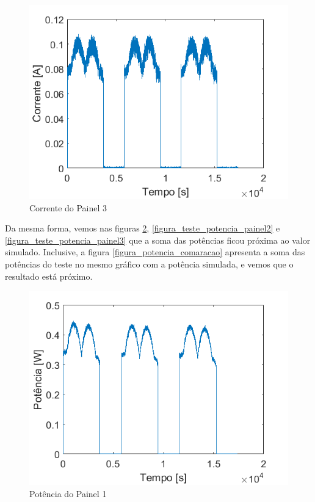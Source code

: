 \begin{figure}[!htpb]
\begin{center}
\includegraphics[scale=0.5]{figures/testPanel3Current.png}
\caption{Corrente do Painel 3}
\label{figura_teste_corrente_painel3}
\end{center}
\end{figure}

Da mesma forma, vemos nas figuras \ref{figura_teste_potencia_painel1}, \ref{figura_teste_potencia_painel2} e \ref{figura_teste_potencia_painel3} que a soma das potências ficou próxima ao valor simulado. Inclusive, a figura \ref{figura_potencia_comaracao} apresenta a soma das potências do teste no mesmo gráfico com a potência simulada, e vemos que o resultado está próximo.

\begin{figure}[!htpb]
\begin{center}
\includegraphics[scale=0.5]{figures/testPanel1Power.png}
\caption{Potência do Painel 1}
\label{figura_teste_potencia_painel1}
\end{center}
\end{figure}

